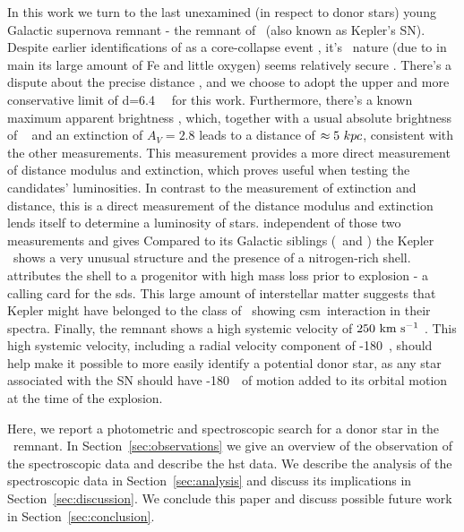 \documentclass[preprint2]{aastex}
\begin{document}
In this work we turn to the last unexamined (in respect to donor stars) young Galactic supernova remnant - the remnant of \ (also known as Kepler's SN). Despite earlier identifications of  as a core-collapse event \citep[e.g.][]{1987ApJ...319..885B}, it's \sneia\ nature (due to in main its large amount of Fe and little oxygen) seems relatively secure \citep{2007ApJ...668L.135R, 2012ApJ...756....6P}.  There's a dispute about the precise distance \citep[$4-6.4$\,\kpc; see][and references therein]{2012A&A...537A.139C}, and we choose to adopt the upper and more conservative limit of d=6.4~\kpc\ \citep{1999AJ....118..926R} for this work. Furthermore, there's a known maximum apparent brightness \citep[V=-3;][]{1971SvA....14..798P}, which, together with a usual absolute brightness of \sneia\  \citep[$M_V=-19.3$;][]{2011ApJ...732..129R} and an extinction of $A_V=2.8$ \citep{2007ApJ...668L.135R} leads to a distance of $\approx 5~kpc$, consistent with the other measurements. This measurement provides a more direct measurement of distance modulus and extinction, which proves useful when testing the candidates' luminosities. In contrast to the measurement of extinction and distance, this is a direct measurement of the distance modulus and extinction lends itself to determine a luminosity of stars.  independent of those two measurements and gives Compared to its Galactic siblings (\ and ) the Kepler \snr\ shows a very unusual structure and the presence of a nitrogen-rich shell.  \citet{2012A&A...537A.139C} attributes the shell to a progenitor with high mass loss prior to explosion - a calling card for the \gls{sds}. This large amount of interstellar matter suggests that Kepler might have belonged to the class of \sneia\ showing \gls{csm}\ interaction in their spectra. Finally, the remnant shows a high systemic velocity of  $250~\textrm{km}~\textrm{s}^{-1}$ \citep{1991ApJ...366..484B,2003A&A...407..249S}. This high systemic velocity, including a radial velocity component of -180~\kms, should help make it possible to more easily identify a potential donor star, as any star associated with the SN should have -180~\kms\ of motion added to its orbital motion at the time of the explosion.



Here, we report a photometric and spectroscopic search for a donor star in the \ remnant. In Section~\ref{sec:observations} we give an overview of the observation of the spectroscopic data and describe the \gls{hst} data. We describe the analysis of the spectroscopic data in Section~\ref{sec:analysis} and discuss its implications in Section~\ref{sec:discussion}. We conclude this paper and discuss possible future work in Section~\ref{sec:conclusion}.
\end{document}
